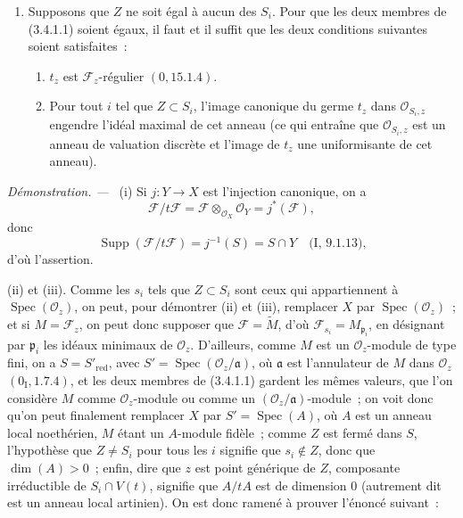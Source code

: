 \documentclass[10pt,oneside]{book}
\newenvironment{proof}{%
  \par\medskip\noindent\textit{Démonstration. ---\ }}{\par}
\begin{document}
\begin{enumerate}
\item[(iii)] Supposons que $Z$ ne soit égal à aucun des $S_i$. Pour que les
deux membres de (3.4.1.1) soient égaux, il faut et il suffit que les deux
conditions suivantes soient satisfaites~:
\begin{enumerate}
\item[$\alpha$)] $t_z$ est $\mathcal F_z$-régulier $(0,15.1.4)$.
\item[$\beta$)] Pour tout $i$ tel que $Z\subset S_i$, l'image canonique du
germe $t_z$ dans $\mathcal O_{S_i,z}$ engendre l'idéal maximal de cet anneau
(ce qui entraîne que $\mathcal O_{S_i,z}$ est un anneau de valuation discrète
et l'image de $t_z$ une uniformisante de cet anneau).
\end{enumerate}
\end{enumerate}

\begin{proof}
(i) Si $j:Y\to X$ est l'injection canonique, on a
\[
\mathcal F/t\mathcal F
=\mathcal F\otimes_{\mathcal O_X}\mathcal O_Y
=j^*(\mathcal F),
\]
donc
\[
\operatorname{Supp}(\mathcal F/t\mathcal F)
=j^{-1}(S)=S\cap Y
\quad\text{(I, 9.1.13),}
\]
d'où l'assertion.

(ii) et (iii). Comme les $s_i$ tels que $Z\subset S_i$ sont ceux qui
appartiennent à $\operatorname{Spec}(\mathcal O_z)$, on peut, pour démontrer
(ii) et (iii), remplacer $X$ par $\operatorname{Spec}(\mathcal O_z)$~; et si
$M=\mathcal F_z$, on peut donc supposer que $\mathcal F=\widetilde M$, d'où
$\mathcal F_{s_i}=M_{\mathfrak p_i}$, en désignant par $\mathfrak p_i$ les
idéaux minimaux de $\mathcal O_z$. D'ailleurs, comme $M$ est un
$\mathcal O_z$-module de type fini, on a $S=S'_{\mathrm{red}}$, avec
$S'=\operatorname{Spec}(\mathcal O_z/\mathfrak a)$, où $\mathfrak a$ est
l'annulateur de $M$ dans $\mathcal O_z$ $(0_{\mathrm I},1.7.4)$, et les deux
membres de (3.4.1.1) gardent les mêmes valeurs, que l'on considère $M$ comme
$\mathcal O_z$-module ou comme un $(\mathcal O_z/\mathfrak a)$-module~; on voit
donc qu'on peut finalement remplacer $X$ par $S'=\operatorname{Spec}(A)$, où
$A$ est un anneau local noethérien, $M$ étant un $A$-module fidèle~; comme $Z$
est fermé dans $S$, l'hypothèse que $Z\neq S_i$ pour tous les $i$ signifie que
$s_i\notin Z$, donc que $\dim(A)>0$~; enfin, dire que $z$ est point générique
de $Z$, composante irréductible de $S_i\cap V(t)$, signifie que $A/tA$ est de
dimension $0$ (autrement dit est un anneau local artinien). On est donc ramené
à prouver l'énoncé suivant~:
\end{proof}
\end{document}
